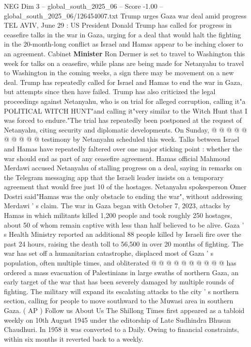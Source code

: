 \begin{textsample}{NEG Dim 3 – global\_south\_2025\_06 – Score -1.00 – global\_south\_2025\_06/126454007.txt}  \label{ex:f3_neg_264}
Trump urges Gaza war deal amid progress TEL AVIV, June 29 : US President Donald Trump has called for progress in ceasefire talks in the war in Gaza, urging for a deal that would halt the fighting in the 20-month-long conflict as Israel and Hamas appear to be inching closer to an agreement.
Cabinet \textbf{Minister} Ron Dermer is set to travel to Washington this week for talks on a ceasefire, while plans are being made for Netanyahu to travel to Washington in the coming weeks, a sign there may be movement on a new deal.
Trump has repeatedly called for Israel and Hamas to end the war in Gaza, but attempts since then have failed.
Trump has also criticized the legal proceedings against Netanyahu, who is on trial for alleged corruption, calling it"a POLITICAL WITCH HUNT"and calling it"very similar to the Witch Hunt that I was forced to endure."The trial has repeatedly been postponed at the request of Netanyahu, citing security and diplomatic developments.
On Sunday, @ @ @ @ @ @ @ @ @ @ testimony by Netanyahu scheduled this week.
Talks between Israel and Hamas have repeatedly faltered over one major sticking point : whether the war should end as part of any ceasefire agreement.
Hamas official Mahmoud Merdawi accused Netanyahu of stalling progress on a deal, saying in remarks on the Telegram messaging app that the Israeli leader insists on a temporary agreement that would free just 10 of the hostages.
Netanyahu spokesperson Omer Dostri said"Hamas was the only obstacle to ending the war", without addressing Merdawi ' s claim.
The war in Gaza began with October 7, 2023, attacks by Hamas in which militants killed 1,200 people and took roughly 250 hostages, about 50 of whom remain captive with less than half believed to be alive.
Gaza ' s Health Ministry reported an additional 88 people killed by Israeli fire over the past 24 hours, raising the death toll to 56,500 in over 20 months of fighting.
The war has set off a humanitarian catastrophe, displaced most of Gaza ' s population, often multiple times, and obliterated @ @ @ @ @ @ @ @ @ @ has ordered a mass evacuation of Palestinians in large swaths of northern Gaza, an early target of the war that has been severely damaged by multiple rounds of fighting.
The military will expand its escalating attacks to the city ' s northern section, calling for people to move southward to the Muwasi area in southern Gaza. ( AP ) Follow us About Us The Shillong Times first appeared as a tabloid weekly on 10th August 1945 under the editorship of Late Sudhindra Bhusan Chaudhuri.
In 1958 it was converted to a Daily.
Owing to financial constraints, within six months it reverted back to a weekly.

\end{textsample}
